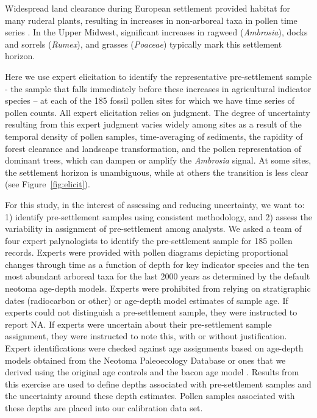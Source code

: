 \documentclass[12pt]{article}
\begin{document}
Widespread land clearance during European settlement provided habitat
for many ruderal plants, resulting in increases in non-arboreal taxa
in pollen time series  \citep{mcandrews1988human}. In the Upper Midwest,
significant increases in ragweed (\textit{Ambrosia}), docks and
sorrels (\textit{Rumex}), and grasses (\textit{Poaceae}) typically
mark this settlement horizon.

Here we use expert elicitation to identify the representative
pre-settlement sample - the sample that falls immediately before these
increases in agricultural indicator species -- at each of the 185
fossil pollen sites for which we have time series of pollen
counts. All expert elicitation relies on judgment. The degree of
uncertainty resulting from this expert judgment varies widely among
sites as a result of the temporal density of pollen samples,
time-averaging of sediments, the rapidity of forest clearance and
landscape transformation, and the pollen representation of dominant
trees, which can dampen or amplify the \textit{Ambrosia} signal. At
some sites, the settlement horizon is unambiguous, while at others the
transition is less clear (see Figure~\ref{fig:elicit}).

For this study, in the interest of assessing and reducing uncertainty,
we want to: 1) identify pre-settlement samples using consistent
methodology, and 2) assess the variability in assignment of
pre-settlement among analysts. We asked a team of four expert
palynologists to identify the pre-settlement sample for 185 pollen
records. Experts were provided with pollen diagrams depicting
proportional changes through time as a function of depth for key
indicator species and the ten most abundant arboreal taxa for the last
2000 years as determined by the default neotoma age-depth
models. Experts were prohibited from relying on stratigraphic dates
(radiocarbon or other) or age-depth model estimates of sample age. If
experts could not distinguish a pre-settlement sample, they were
instructed to report NA. If experts were uncertain about their
pre-settlement sample assignment, they were instructed to note this,
with or without justification. Expert identifications were checked
against age assignments based on age-depth models obtained from the
Neotoma Paleoecology Database or ones that we derived using the
original age controls and the bacon age model
\citep{blaauw2011flexible}.  Results from this exercise are used to
define depths associated with pre-settlement samples and the
uncertainty around these depth estimates. Pollen samples associated
with these depths are placed into our calibration data set.
\end{document}
